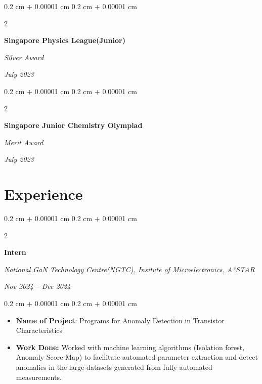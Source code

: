 \documentclass[10pt, letterpaper]{article}
\newenvironment{highlights}{
    \begin{itemize}[
        topsep=0.10 cm,
        parsep=0.10 cm,
        partopsep=0pt,
        itemsep=0pt,
        leftmargin=0.4 cm + 10pt
    ]
}{
    \end{itemize}
} %
\newenvironment{onecolentry}{
    \begin{adjustwidth}{
        0.2 cm + 0.00001 cm
    }{
        0.2 cm + 0.00001 cm
    }
}{
    \end{adjustwidth}
} %
\newenvironment{twocolentry}[2][]{
    \onecolentry
    \def\secondColumn{#2}
    \setcolumnwidth{\fill, 4.5 cm}
    \begin{paracol}{2}
}{
    \switchcolumn \raggedleft \secondColumn
    \end{paracol}
    \endonecolentry
} %
\begin{document}
        \begin{twocolentry}{
            
            
        \textit{July 2023 }}
            \textbf{Singapore Physics League(Junior)}

            \textit{Silver Award}

        \end{twocolentry}
\begin{twocolentry}{
\textit{July 2023 }}
            \textbf{Singapore Junior Chemistry Olympiad}

            \textit{Merit Award}

        \end{twocolentry}

        






        

        

        

      




        
  

    
   \section{Experience}



        
        \begin{twocolentry}{
            
            
        \textit{Nov 2024 – Dec 2024}}
            \textbf{Intern}

            \textit{National GaN Technology Centre(NGTC), Insitute of Microelectronics, A*STAR}
        \end{twocolentry}

        \vspace{0.10 cm}
        \begin{onecolentry}
            \begin{highlights}
                \item \textbf{Name of Project}: Programs for Anomaly Detection in Transistor Characteristics
                \item \textbf{Work Done:} Worked with machine learning algorithms (Isolation forest, Anomaly Score Map) to facilitate automated parameter extraction and detect anomalies in the large datasets generated from fully automated measurements.
            \end{highlights}
        \end{onecolentry}
\newpage
\end{document}

